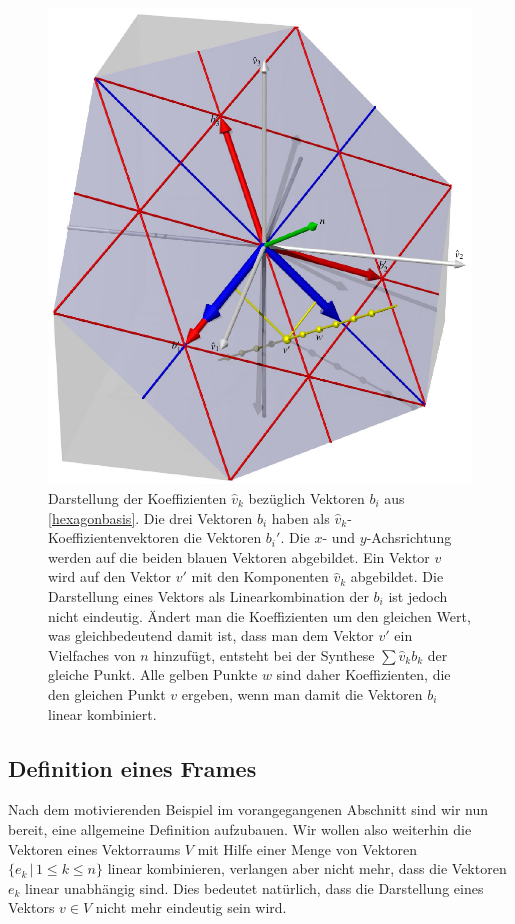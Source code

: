 \begin{figure}
\centering
\includegraphics{chapters/1-geometrie/images/tri.pdf}
\caption{Darstellung der Koeffizienten $\hat{v}_k$ bezüglich Vektoren $b_i$
aus \eqref{hexagonbasis}.
Die drei Vektoren $b_i$ haben als $\hat{v}_k$-Koeffizientenvektoren
die Vektoren $b_i'$.
Die $x$- und $y$-Achsrichtung werden auf die beiden blauen Vektoren
abgebildet.
Ein Vektor $v$ wird auf den Vektor $v'$ mit den Komponenten
$\hat{v}_k$ abgebildet.
Die Darstellung eines Vektors als Linearkombination der $b_i$ ist
jedoch nicht eindeutig.
Ändert man die Koeffizienten um den gleichen Wert, was gleichbedeutend damit
ist, dass man dem Vektor $v'$ ein Vielfaches von $n$ hinzufügt, entsteht
bei der Synthese $\sum \hat{v}_k b_k$ der gleiche Punkt.
Alle gelben Punkte $w$ sind daher Koeffizienten, die den gleichen Punkt $v$
ergeben, wenn man damit die Vektoren $b_i$ linear kombiniert.
\label{3dbasisbild}}
\end{figure}

%
%
\subsection{Definition eines Frames}
Nach dem motivierenden Beispiel im vorangegangenen Abschnitt sind wir nun
bereit, eine allgemeine Definition aufzubauen.
Wir wollen also weiterhin die Vektoren eines Vektorraums $V$ mit Hilfe
einer Menge von Vektoren $\{e_k\,|\,1\le k\le n\}$ linear kombinieren,
verlangen aber nicht mehr, dass die Vektoren $e_k$ linear unabhängig sind.
Dies bedeutet natürlich, dass die Darstellung eines Vektors $v\in V$
nicht mehr eindeutig sein wird.

